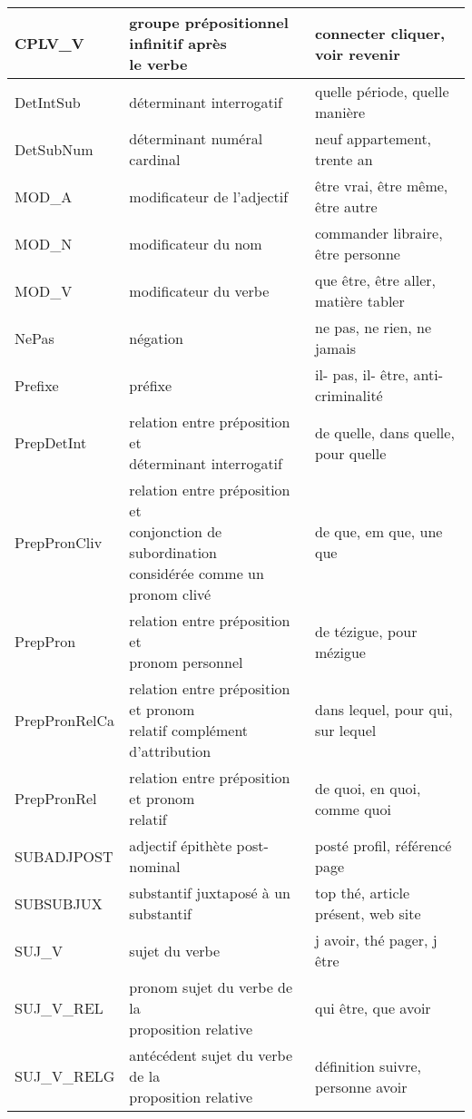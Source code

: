\documentclass[oneside,parskip,draft]{scrbook}
\makeatletter
\newcommand{\specialcell}[2][l]{%
      \begin{tabular}[#1]{@{}l@{}}#2\end{tabular}}
\makeatother
\begin{document}
\begin{longtable}{lll}
    CPLV\_V       &  \specialcell{groupe prépositionnel infinitif après \\ le verbe} & connecter cliquer, voir revenir \\ \midrule
    DetIntSub     &  déterminant interrogatif              & quelle période, quelle manière \\ \midrule
    DetSubNum     &  déterminant numéral cardinal          & neuf appartement, trente an \\ \midrule
    MOD\_A        &  modificateur de l'adjectif            & être vrai, être même, être autre \\ \midrule
    MOD\_N        &  modificateur du nom                   & commander libraire, être personne  \\ \midrule
    MOD\_V        &  modificateur du verbe                 & que être, être aller, matière tabler \\ \midrule
    NePas         &  négation                              & ne pas, ne rien, ne jamais \\ \midrule
    Prefixe       &  préfixe                               & il- pas, il- être, anti-criminalité \\ \midrule
    PrepDetInt    &  \specialcell{relation entre préposition et \\ déterminant interrogatif} & de quelle, dans quelle, pour quelle \\ \midrule
    PrepPronCliv  &  \specialcell{relation entre préposition et \\ conjonction de subordination \\ considérée comme un pronom clivé} & de que, em que, une que \\ \midrule
    PrepPron      &  \specialcell{relation entre préposition et \\ pronom personnel} & de tézigue, pour mézigue \\ \midrule
    PrepPronRelCa &  \specialcell{relation entre préposition et pronom \\ relatif complément d'attribution} & dans lequel, pour qui, sur lequel  \\ \midrule
    PrepPronRel   &  \specialcell{relation entre préposition et pronom \\ relatif} & de quoi, en quoi, comme quoi \\ \midrule
    SUBADJPOST    &  adjectif épithète post-nominal        & posté profil, référencé page \\ \midrule
    SUBSUBJUX     &  substantif juxtaposé à un substantif  & top thé, article présent, web site \\ \midrule
    SUJ\_V        &  sujet du verbe                        & j avoir, thé pager, j être \\ \midrule
    SUJ\_V\_REL   &  \specialcell{pronom sujet du verbe de la \\ proposition relative} & qui être, que avoir \\ \midrule
    SUJ\_V\_RELG  &  \specialcell{antécédent sujet du verbe de la \\ proposition relative} & définition suivre, personne avoir \\
    \bottomrule


\end{longtable}
\end{document}
